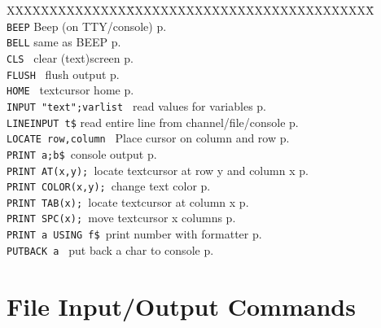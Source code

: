 \begin{tabbing}
XXXXXXXXXXXXXX\=XXXXXXXXXXXXXXXXXXXXXXXXXXXXX\=\kill\\
{\tt BEEP}\> Beep (on TTY/console)\> p.\pageref{BEEP}\\
{\tt BELL}\> same as BEEP\> p.\pageref{BELL}\\
{\tt CLS		}\> clear (text)screen \> p.\pageref{CLS}\\
{\tt FLUSH 	}\> flush output\> p.\pageref{FLUSH}\\
{\tt HOME		}\> textcursor home\> p.\pageref{HOME}\\
{\tt INPUT "text";varlist }\> read values for variables\> p.\pageref{INPUT}\\
{\tt LINEINPUT t\$}\> read entire line from channel/file/console\> p.\pageref{LINEINPUT}\\
{\tt LOCATE row,column	}\> Place cursor on column and row\> p.\pageref{LOCATE}\\

{\tt PRINT a;b\$	}\>console output\> p.\pageref{PRINT}\\
{\tt PRINT AT(x,y);  	}\>locate textcursor at row y and column x\> p.\pageref{PRINTbAT}\\
{\tt PRINT COLOR(x,y);  }\>change text color\> p.\pageref{PRINTbCOLOR}\\
{\tt PRINT TAB(x);  	}\>locate textcursor at column x\> p.\pageref{PRINTbTABbANDbSPC}\\
{\tt PRINT SPC(x);  	}\>move textcursor x columns\> p.\pageref{PRINTbTABbANDbSPC}\\
{\tt PRINT a USING f\$	}\>print number with formatter\> p.\pageref{PRINTbUSING}\\
{\tt PUTBACK a 	}\> put back a char to console\> p.\pageref{PUTBACK}\\

 \end{tabbing}

\section{File Input/Output Commands}

